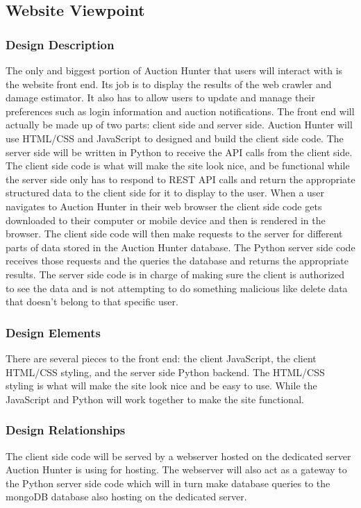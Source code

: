 \documentclass[onecolumn, draftclsnofoot, 10pt, compsoc]{IEEEtran}
\begin{document}
\subsection{Website Viewpoint}
\subsubsection{Design Description}
The only and biggest portion of Auction Hunter that users will interact with is the website front end. Its job is to display the results of the web crawler and damage estimator. It also has to allow users to update and manage their preferences such as login information and auction notifications. The front end will actually be made up of two parts: client side and server side. Auction Hunter will use HTML/CSS and JavaScript to designed and build the client side code. The server side will be written in Python to receive the API calls from the client side. The client side code is what will make the site look nice, and be functional while the server side only has to respond to REST API calls and return the appropriate structured data to the client side for it to display to the user. When a user navigates to Auction Hunter in their web browser the client side code gets downloaded to their computer or mobile device and then is rendered in the browser. The client side code will then make requests to the server for different parts of data stored in the Auction Hunter database. The Python server side code receives those requests and the queries the database and returns the appropriate results. The server side code is in charge of making sure the client is authorized to see the data and is not attempting to do something malicious like delete data that doesn't belong to that specific user. 

\subsubsection{Design Elements}
There are several pieces to the front end: the client JavaScript, the client HTML/CSS styling, and the server side Python backend. The HTML/CSS styling is what will make the site look nice and be easy to use. While the JavaScript and Python will work together to make the site functional. 

\subsubsection{Design Relationships}
The client side code will be served by a webserver hosted on the dedicated server Auction Hunter is using for hosting. The webserver will also act as a gateway to the Python server side code which will in turn make database queries to the mongoDB database also hosting on the dedicated server. 
\end{document}
